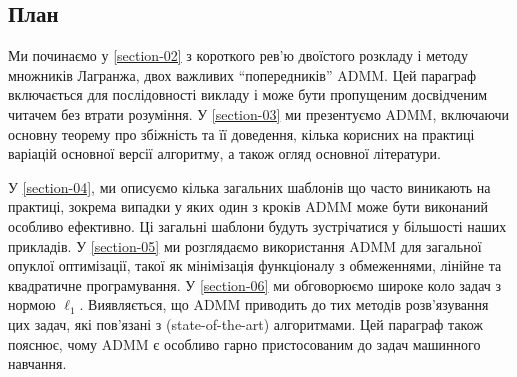 \subsection*{План}

Ми починаємо у \ref{section-02} з короткого рев'ю двоїстого розкладу і методу множників Лагранжа, двох важливих ``попередників'' ADMM. Цей параграф включається для послідовності викладу і може бути пропущеним досвідченим читачем без втрати розуміння. У \ref{section-03} ми презентуємо ADMM, включаючи основну теорему про збіжність та її доведення, кілька корисних на практиці варіацій основної версії алгоритму, а також огляд основної літератури. \medskip

У \ref{section-04}, ми описуємо кілька загальних шаблонів що часто виникають на практиці, зокрема випадки у яких один з кроків ADMM може бути виконаний особливо ефективно. Ці загальні шаблони будуть зустрічатися у більшості наших прикладів. У \ref{section-05} ми розглядаємо використання ADMM для загальної опуклої оптимізації, такої як мінімізація функціоналу з обмеженнями, лінійне та квадратичне програмування. У \ref{section-06} ми обговорюємо широке коло задач з нормою $\ell_1$. Виявляється, що ADMM приводить до тих методів розв'язування цих задач, які пов'язані з (state-of-the-art) алгоритмами. Цей параграф також пояснює, чому ADMM є особливо гарно пристосованим до задач машинного навчання. \medskip


